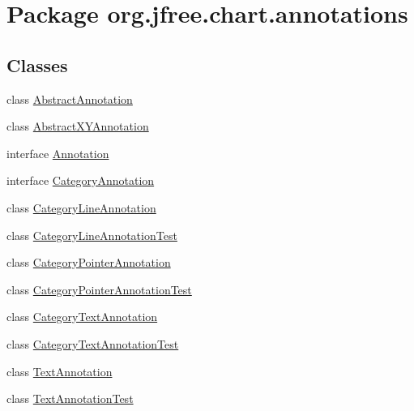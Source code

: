 \hypertarget{namespaceorg_1_1jfree_1_1chart_1_1annotations}{}\section{Package org.\+jfree.\+chart.\+annotations}
\label{namespaceorg_1_1jfree_1_1chart_1_1annotations}
\subsection*{Classes}
\begin{DoxyCompactItemize}
\item 
class \mbox{\hyperlink{classorg_1_1jfree_1_1chart_1_1annotations_1_1_abstract_annotation}{Abstract\+Annotation}}
\item 
class \mbox{\hyperlink{classorg_1_1jfree_1_1chart_1_1annotations_1_1_abstract_x_y_annotation}{Abstract\+X\+Y\+Annotation}}
\item 
interface \mbox{\hyperlink{interfaceorg_1_1jfree_1_1chart_1_1annotations_1_1_annotation}{Annotation}}
\item 
interface \mbox{\hyperlink{interfaceorg_1_1jfree_1_1chart_1_1annotations_1_1_category_annotation}{Category\+Annotation}}
\item 
class \mbox{\hyperlink{classorg_1_1jfree_1_1chart_1_1annotations_1_1_category_line_annotation}{Category\+Line\+Annotation}}
\item 
class \mbox{\hyperlink{classorg_1_1jfree_1_1chart_1_1annotations_1_1_category_line_annotation_test}{Category\+Line\+Annotation\+Test}}
\item 
class \mbox{\hyperlink{classorg_1_1jfree_1_1chart_1_1annotations_1_1_category_pointer_annotation}{Category\+Pointer\+Annotation}}
\item 
class \mbox{\hyperlink{classorg_1_1jfree_1_1chart_1_1annotations_1_1_category_pointer_annotation_test}{Category\+Pointer\+Annotation\+Test}}
\item 
class \mbox{\hyperlink{classorg_1_1jfree_1_1chart_1_1annotations_1_1_category_text_annotation}{Category\+Text\+Annotation}}
\item 
class \mbox{\hyperlink{classorg_1_1jfree_1_1chart_1_1annotations_1_1_category_text_annotation_test}{Category\+Text\+Annotation\+Test}}
\item 
class \mbox{\hyperlink{classorg_1_1jfree_1_1chart_1_1annotations_1_1_text_annotation}{Text\+Annotation}}
\item 
class \mbox{\hyperlink{classorg_1_1jfree_1_1chart_1_1annotations_1_1_text_annotation_test}{Text\+Annotation\+Test}}

\end{DoxyCompactItemize}
